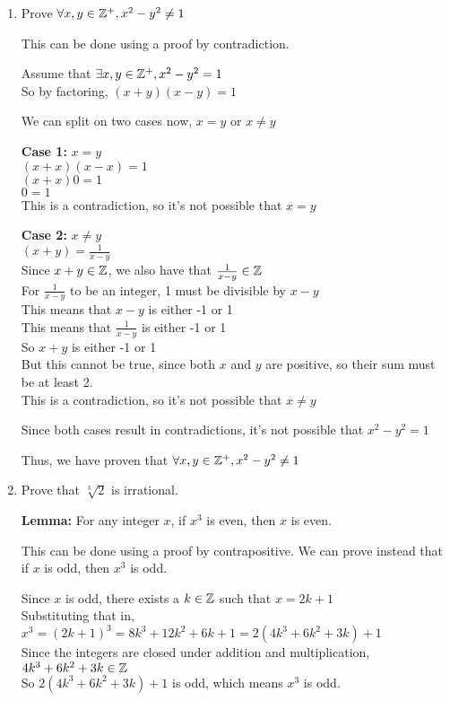 \documentclass[12pt, leqno]{article}
\begin{document}
\begin{enumerate}
    \item Prove $\forall x, y \in \mathbb Z^+, x^2 - y^2 \neq 1$

    This can be done using a proof by contradiction.

    Assume that $\exists x, y \in \mathbb Z^+, x^2 - y^2 = 1$\\
    So by factoring, $(x + y)(x - y) = 1$

    We can split on two cases now, $x = y$ or $x \neq y$

    \textbf{Case 1:} $x = y$\\
    $(x + x)(x - x) = 1$\\
    $(x + x)0 = 1$\\
    $0 = 1$\\
    This is a contradiction, so it's not possible that $x = y$

    \textbf{Case 2:} $x \neq y$\\
    $(x + y) = \frac 1{x-y}$\\
    Since $x + y \in \mathbb Z$, we also have that $\frac 1{x-y} \in \mathbb Z$\\
    For $\frac 1{x-y}$ to be an integer, 1 must be divisible by $x-y$\\
    This means that $x-y$ is either -1 or 1\\
    This means that $\frac 1{x-y}$ is either -1 or 1\\
    So $x+y$ is either -1 or 1\\
    But this cannot be true, since both $x$ and $y$ are positive, so their sum must be at least 2.\\
    This is a contradiction, so it's not possible that $x \neq y$

    Since both cases result in contradictions, it's not possible that $x^2-y^2=1$

    Thus, we have proven that $\forall x, y \in \mathbb Z^+, x^2 - y^2 \neq 1$

    \item Prove that $\sqrt[3]{2}$ is irrational.

    \textbf{Lemma:} For any integer $x$, if $x^3$ is even, then $x$ is even.

    This can be done using a proof by contrapositive. We can prove instead that if $x$ is odd, then $x^3$ is odd.

    Since $x$ is odd, there exists a $k \in \mathbb Z$ such that $x = 2k+1$\\
    Substituting that in, $x^3 = (2k+1)^3 = 8k^3 + 12k^2 + 6k + 1 = 2(4k^3 + 6k^2 + 3k) + 1$\\
    Since the integers are closed under addition and multiplication, $4k^3 + 6k^2 + 3k \in \mathbb Z$\\
    So $2(4k^3 + 6k^2 + 3k) + 1$ is odd, which means $x^3$ is odd.


\end{enumerate}
\end{document}
